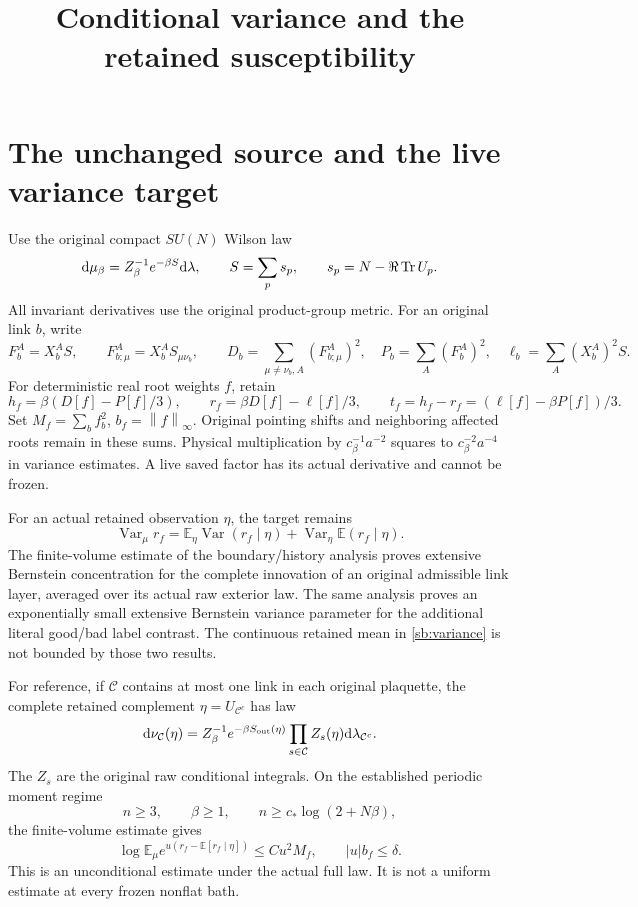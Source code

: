 \documentclass[11pt]{article}
\title{Conditional variance and the retained susceptibility}\author{}\date{}
\theoremstyle{definition}\newtheorem{definition}[theorem]{Definition}
\theoremstyle{remark}\newtheorem{remark}[theorem]{Remark}
\newcommand{\E}{\mathbb E}\newcommand{\Var}{\operatorname{Var}}
\newcommand{\dd}{\mathrm d}\newcommand{\id}{\mathrm{id}}
\newcommand{\norm}[1]{\left\lVert #1\right\rVert}
\begin{document}
\maketitle
\section{The unchanged source and the live variance target}
\label{sb:setup}

Use the original compact \(SU(N)\) Wilson law
\[
 \dd\mu_\beta=Z_\beta^{-1}e^{-\beta S}\dd\lambda,\qquad
 S=\sum_p s_p,\qquad s_p=N-\Re\Tr U_p.
\]
All invariant derivatives use the original product-group metric. For an original link \(b\), write
\[
 F_b^A=X_b^AS,\qquad F_{b;\mu}^A=X_b^AS_{\mu\nu_b},\qquad
 D_b=\sum_{\mu\ne\nu_b,A}(F_{b;\mu}^A)^2,\quad
 P_b=\sum_A(F_b^A)^2,\quad \ell_b=\sum_A(X_b^A)^2S.
\]
For deterministic real root weights \(f\), retain
\begin{equation}
 h_f=\beta(D[f]-P[f]/3),\qquad
 r_f=\beta D[f]-\ell[f]/3,\qquad
 t_f=h_f-r_f=(\ell[f]-\beta P[f])/3.
 \label{sb:sources}
\end{equation}
Set \(M_f=\sum_bf_b^2\), \(b_f=\norm f_\infty\). Original pointing shifts and neighboring affected roots remain in these sums. Physical multiplication by \(c_\beta^{-1}a^{-2}\) squares to \(c_\beta^{-2}a^{-4}\) in variance estimates. A live saved factor has its actual derivative and cannot be frozen.

For an actual retained observation \(\eta\), the target remains
\begin{equation}
 \Var_\mu r_f
 =
 \E_\eta\Var(r_f\mid\eta)
 +
 \Var_\eta\E(r_f\mid\eta).
 \label{sb:variance}
\end{equation}
The finite-volume estimate of the boundary/history analysis proves extensive Bernstein concentration for the complete innovation of an original admissible link layer, averaged over its actual raw exterior law. The same analysis proves an exponentially small extensive Bernstein variance parameter for the additional literal good/bad label contrast. The continuous retained mean in \eqref{sb:variance} is not bounded by those two results.

For reference, if \(\mathcal C\) contains at most one link in each original plaquette, the complete retained complement \(\eta=U_{\mathcal C^c}\) has law
\[
 \dd\nu_{\mathcal C}(\eta)
 =Z_\beta^{-1}e^{-\beta S_{\rm out}(\eta)}
       \prod_{s\in\mathcal C}Z_s(\eta)\dd\lambda_{\mathcal C^c}.
\]
The \(Z_s\) are the original raw conditional integrals. On the established periodic moment regime
\begin{equation}
 n\ge3,\qquad\beta\ge1,\qquad n\ge c_*\log(2+N\beta),
 \label{sb:momentregime}
\end{equation}
the finite-volume estimate gives
\[
 \log\E_\mu e^{u(r_f-\E[r_f\mid\eta])}\le Cu^2M_f,
 \qquad |u|b_f\le\delta.
\]
This is an unconditional estimate under the actual full law. It is not a uniform estimate at every frozen nonflat bath.
\end{document}
